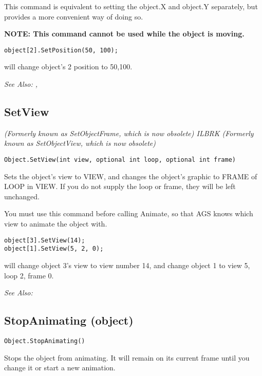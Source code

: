 This command is equivalent to setting the object.X and object.Y separately, but provides a
more convenient way of doing so.

\bf{NOTE:} This command cannot be used while the object is moving.

\begin{verbatim}
object[2].SetPosition(50, 100);
\end{verbatim}
will change object's 2 position to 50,100.

\it{See Also:} , 


\subsection{SetView}\label{Object.SetView}%

\it{(Formerly known as SetObjectFrame, which is now obsolete)} ILBRK
\it{(Formerly known as SetObjectView, which is now obsolete)}

\begin{verbatim}
Object.SetView(int view, optional int loop, optional int frame)
\end{verbatim}
Sets the object's view to VIEW, and changes the object's graphic to FRAME of LOOP in VIEW.
If you do not supply the loop or frame, they will be left unchanged.

You must use this command before calling Animate, so that AGS knows which view to animate
the object with.

\begin{verbatim}
object[3].SetView(14);
object[1].SetView(5, 2, 0);
\end{verbatim}
will change object 3's view to view number 14, and change object 1 to view 5, loop 2, frame 0.

\it{See Also:} 


\subsection{StopAnimating (object)}\label{Object.StopAnimating}%

\begin{verbatim}
Object.StopAnimating()
\end{verbatim}
Stops the object from animating. It will remain on its current frame until you change it
or start a new animation.

